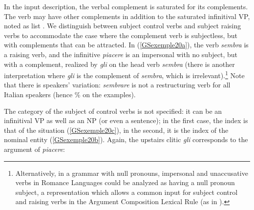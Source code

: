 \documentclass[output=paper
                ,modfonts
                ,nonflat
	        ,collection
	        ,collectionchapter
	        ,collectiontoclongg
 	        ,biblatex
                ,babelshorthands
                ,newtxmath
                ,draftmode
                ,colorlinks, citecolor=brown
]{./langsci/langscibook}
\begin{document}
{In the input description, the verbal complement is saturated for its complements. The verb may have other complements in addition to the saturated infinitival VP, noted as list . We distinguish between subject control verbs and subject raising verbs to accommodate the case where the complement verb is subjectless, but with complements that can be attracted. In (\ref{GSexemple20a}), the verb \textit{sembra} is a raising verb, and the infinitive \textit{piacere} is an impersonal with no subject, but with a complement, realized by \textit{gli} on the head verb \textit{sembra} (there is another interpretation where \textit{gli} is the complement of \textit{sembra}, which is irrelevant).\footnote{Alternatively, in a grammar with null pronouns, impersonal and unaccusative verbs in Romance Languages could be analyzed as having a null pronoun subject, a representation which allows a common input for subject control and raising verbs in the Argument Composition Lexical Rule (as in \citealt{Monachesi98a}).} Note that there is speakers' variation: \textit{sembrare} is not a restructuring verb for all Italian speakers (hence \% on the examples).   

The category of the subject of control verbs is not specified: it can be an infinitival VP as well as an NP (or even a sentence); in the first case, the index is that of the situation (\ref{GSexemple20c}), in the second, it is the index of the nominal entity (\ref{GSexemple20b}). Again, the upstairs clitic \textit{gli} corresponds to the argument of \textit{piacere}:

\begin{exe}
	\ex \label{GSexemple20} 
	\begin{xlist}
        \label{GSexemple20a}

		\label{GSexemple20b}		
		
		\label{GSexemple20c}	
	\end{xlist}
\end{exe}

}
\end{document}
